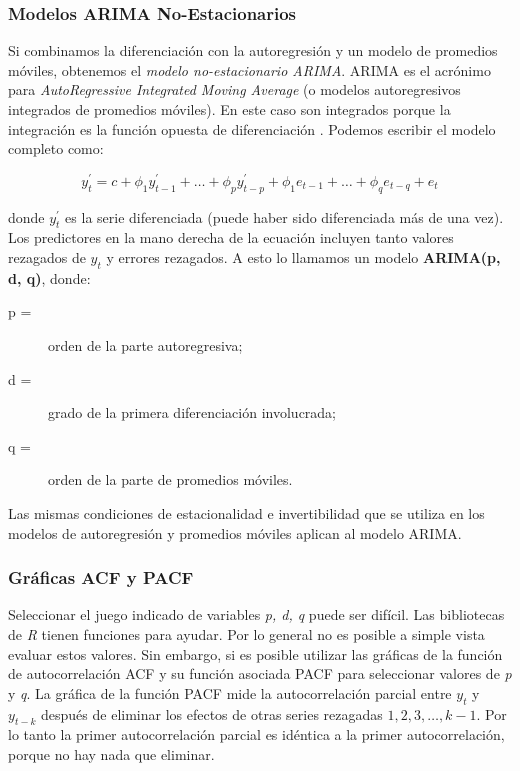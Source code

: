 \begin{spacing}{1.5}
\subsubsection{Modelos ARIMA No-Estacionarios}
Si combinamos la diferenciación con la autoregresión y un modelo de promedios móviles, obtenemos el \emph{modelo no-estacionario ARIMA}. ARIMA es el acrónimo para \emph{AutoRegressive Integrated Moving Average} (o modelos autoregresivos integrados de promedios móviles). En este caso son integrados porque la integración es la función opuesta de diferenciación \cite{hyndman}. Podemos escribir el modelo completo como:

\[ y_{t}^{\prime} = c + \phi_{1}y_{t-1}^{\prime} + \ldots + \phi_{p}y_{t-p}^{\prime} + \phi_{1}e_{t-1} + \ldots + \phi_{q}e_{t-q} + e_{t} \]

donde $y_{t}^{\prime}$ es la serie diferenciada (puede haber sido diferenciada más de una vez). Los predictores en la mano derecha de la ecuación incluyen tanto valores rezagados de $y_t$ y errores rezagados. A esto lo llamamos un modelo \textbf{ARIMA(p, d, q)}, donde:

\begin{description}
  \item [p = ]
  orden de la parte autoregresiva;
  \item [d = ]
  grado de la primera diferenciación involucrada; 
  \item [q = ]
  orden de la parte de promedios móviles.
\end{description}

Las mismas condiciones de estacionalidad e invertibilidad que se utiliza en los modelos de autoregresión y promedios móviles aplican al modelo ARIMA. 

\subsubsection{Gráficas ACF y PACF}
Seleccionar el juego indicado de variables \emph{p, d, q} puede ser difícil. Las bibliotecas de \emph{R} tienen funciones para ayudar. Por lo general no es posible a simple vista evaluar estos valores. Sin embargo, si es posible utilizar las gráficas de la función de autocorrelación ACF y su función asociada PACF para seleccionar valores de \textit{p} y \textit{q}. La gráfica de la función PACF mide la autocorrelación parcial entre $y_{t}$ y $y_{t-k}$ después de eliminar los efectos de otras series rezagadas $1, 2, 3, \ldots, k-1$. Por lo tanto la primer autocorrelación parcial es idéntica a la primer autocorrelación, porque no hay nada que eliminar. 


\end{spacing}
